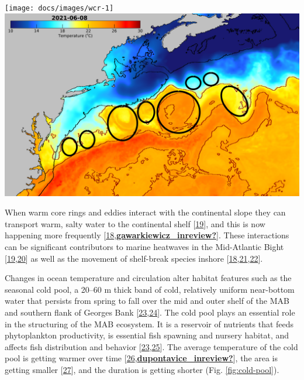 \documentclass[
  10pt,
]{article}
\let\origfigure\figure
\let\endorigfigure\endfigure
\renewenvironment{figure}[1][2] {
    \expandafter\origfigure\expandafter[H]
} {
    \endorigfigure
}
\begin{document}
\begin{figure}

{\centering \texttt{[image: docs/images/wcr-1]} \includegraphics[width=0.49\linewidth]{images/D_20210608-MUR-SST-WCR} 

}

\caption{Warm core ring formation on the Northeast US Shelf: Annual number of rings (Left) and June 2021 rings (right), where the black line is the 200 m isobath (the shelf break) and the red lines are the 20 and 24 degree isotherms.}\label{fig:wcr}
\end{figure}

When warm core rings and eddies interact with the continental slope they
can transport warm, salty water to the continental shelf
{[}\protect\hyperlink{ref-chen_mesoscale_2022}{19}{]}, and this is now
happening more frequently
{[}\protect\hyperlink{ref-gawarkiewicz_changing_2018}{18},\protect\hyperlink{ref-gawarkiewicz_inreview}{\textbf{gawarkiewicz\_inreview?}}{]}.
These interactions can be significant contributors to marine heatwaves
in the Mid-Atlantic Bight
{[}\protect\hyperlink{ref-chen_mesoscale_2022}{19},\protect\hyperlink{ref-gawarkiewicz_characteristics_2019}{20}{]}
as well as the movement of shelf-break species inshore
{[}\protect\hyperlink{ref-gawarkiewicz_changing_2018}{18},\protect\hyperlink{ref-potter_horizontal_2011}{21},\protect\hyperlink{ref-worm_predator_2003}{22}{]}.

Changes in ocean temperature and circulation alter habitat features such
as the seasonal cold pool, a 20--60 m thick band of cold, relatively
uniform near-bottom water that persists from spring to fall over the mid
and outer shelf of the MAB and southern flank of Georges Bank
{[}\protect\hyperlink{ref-lentz_seasonal_2017}{23},\protect\hyperlink{ref-chen_seasonal_2018}{24}{]}.
The cold pool plays an essential role in the structuring of the MAB
ecosystem. It is a reservoir of nutrients that feeds phytoplankton
productivity, is essential fish spawning and nursery habitat, and
affects fish distribution and behavior
{[}\protect\hyperlink{ref-lentz_seasonal_2017}{23},\protect\hyperlink{ref-miles_offshore_2021}{25}{]}.
The average temperature of the cold pool is getting warmer over time
{[}\protect\hyperlink{ref-miller_state-space_2016}{26},\protect\hyperlink{ref-dupontavice_inreview}{\textbf{dupontavice\_inreview?}}{]},
the area is getting smaller
{[}\protect\hyperlink{ref-friedland_middle_2022}{27}{]}, and the
duration is getting shorter (Fig. \ref{fig:cold-pool}).
\end{document}
